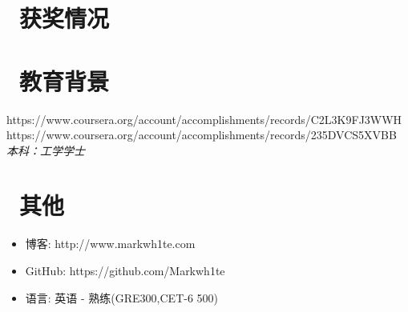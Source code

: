 \documentclass{resume}
\begin{document}
\section{\faHeartO\ 获奖情况}
\section{\faGraduationCap\  教育背景}

https://www.coursera.org/account/accomplishments/records/C2L3K9FJ3WWH
https://www.coursera.org/account/accomplishments/records/235DVCS5XVBB
\textit{本科：工学学士}\ 

\section{\faInfo\ 其他}
\begin{itemize}[parsep=0.5ex]
  \item 博客: http://www.markwh1te.com
  \item GitHub: https://github.com/Markwh1te
  \item 语言: 英语 - 熟练(GRE300,CET-6 500)
\end{itemize}

%
%
\end{document}
